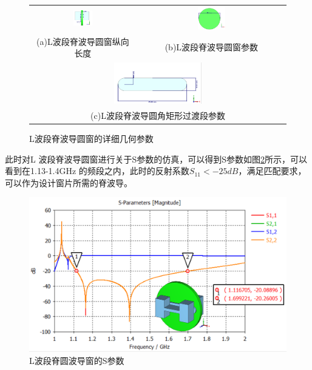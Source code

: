 \documentclass[master]{thesis-uestc}
\begin{document}
\begin{figure}[!htb]
    \small
    \centering
    \begin{tabular}{@{\ }c@{\ }c}
        \includegraphics[width=0.19\textwidth]{pic/chapter4/L波段窗纵向长度ORI.png} & 
        \hspace{5pt}
        \includegraphics[width=0.19\textwidth]{pic/chapter4/L波段圆形窗片.png}     \\
        \mbox{\small (a)L波段脊波导圆窗纵向长度}                                                                               & 
        \mbox{\small (b)L波段脊波导圆窗参数}                                                           \\[6bp]
        \multicolumn{2}{c}{\includegraphics[width=0.35\textwidth]{pic/chapter4/L波段圆角矩形过渡段ORI.png}} \\  %
        \multicolumn{2}{c}{\mbox{\small (c)L波段脊波导圆角矩形过渡段参数}}             
    \end{tabular}
    \caption{L波段脊波导圆窗的详细几何参数}
    \label{fig:L波段脊波导圆窗的详细几何参数}
\end{figure}

此时对L 波段脊波导圆窗进行关于S参数的仿真，可以得到S参数如图\ref{fig:L波段脊圆波导窗的S参数}所示，可以看到在1.13-1.4GHz 的频段之内，此时的反射系数$S_{11}<-25dB$，满足匹配要求，可以作为设计窗片所需的脊波导。
\begin{figure}[!htb]
    \centering
    \includegraphics[width=0.45\linewidth]{pic/chapter4/L波段脊圆波导窗的S参数.png}
    \caption{L波段脊圆波导窗的S参数}
    \label{fig:L波段脊圆波导窗的S参数}
\end{figure}
\end{document}
